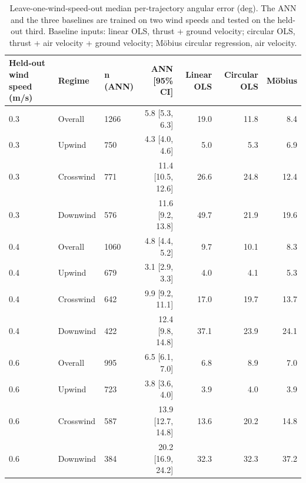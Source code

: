 \begin{table}[h!]
    \centering
    \caption{Leave-one-wind-speed-out median per-trajectory angular error (deg). The ANN and the three baselines are trained on two wind speeds and tested on the held-out third. Baseline inputs: linear OLS, thrust + ground velocity; circular OLS, thrust + air velocity + ground velocity; M\"obius circular regression, air velocity.}
    \label{tab:lowo}
    \begin{tabular}{@{}lllrrrr@{}}
        \toprule
        Held-out wind speed (m/s) & Regime & n (ANN) & ANN [95\% CI] & Linear OLS & Circular OLS & Möbius \\
        \midrule
        0.3 & Overall & 1266 & 5.8 [5.3, 6.3] & 19.0 & 11.8 & 8.4 \\
        0.3 & Upwind & 750 & 4.3 [4.0, 4.6] & 5.0 & 5.3 & 6.9 \\
        0.3 & Crosswind & 771 & 11.4 [10.5, 12.6] & 26.6 & 24.8 & 12.4 \\
        0.3 & Downwind & 576 & 11.6 [9.2, 13.8] & 49.7 & 21.9 & 19.6 \\
        0.4 & Overall & 1060 & 4.8 [4.4, 5.2] & 9.7 & 10.1 & 8.3 \\
        0.4 & Upwind & 679 & 3.1 [2.9, 3.3] & 4.0 & 4.1 & 5.3 \\
        0.4 & Crosswind & 642 & 9.9 [9.2, 11.1] & 17.0 & 19.7 & 13.7 \\
        0.4 & Downwind & 422 & 12.4 [9.8, 14.8] & 37.1 & 23.9 & 24.1 \\
        0.6 & Overall & 995 & 6.5 [6.1, 7.0] & 6.8 & 8.9 & 7.0 \\
        0.6 & Upwind & 723 & 3.8 [3.6, 4.0] & 3.9 & 4.0 & 3.9 \\
        0.6 & Crosswind & 587 & 13.9 [12.7, 14.8] & 13.6 & 20.2 & 14.8 \\
        0.6 & Downwind & 384 & 20.2 [16.9, 24.2] & 32.3 & 32.3 & 37.2 \\
        \bottomrule
    \end{tabular}
\end{table}
